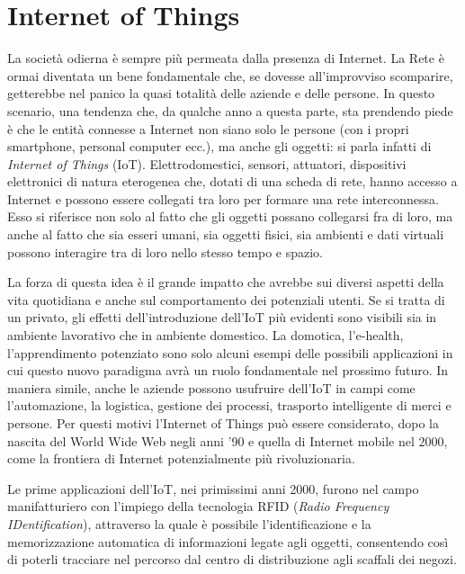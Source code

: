 \section{Internet of Things}
\label{c:tec:iot}

La società odierna è sempre più permeata dalla presenza di Internet. La Rete è ormai diventata un bene fondamentale che, se dovesse all'improvviso scomparire, getterebbe nel panico la quasi totalità delle aziende e delle persone. In questo scenario, una tendenza che, da qualche anno a questa parte, sta prendendo piede è che le entità connesse a Internet non siano solo le persone (con i propri smartphone, personal computer ecc.), ma anche gli oggetti: si parla infatti di \textit{Internet of Things} (IoT). Elettrodomestici, sensori, attuatori, dispositivi elettronici di natura eterogenea che, dotati di una scheda di rete, hanno accesso a Internet e possono essere collegati tra loro per formare una rete interconnessa. Esso si riferisce non solo al fatto che gli oggetti possano collegarsi fra di loro, ma anche al fatto che sia esseri umani, sia oggetti fisici, sia ambienti e dati virtuali possono interagire tra di loro nello stesso tempo e spazio.

La forza di questa idea è il grande impatto che avrebbe sui diversi aspetti della vita quotidiana e anche sul comportamento dei potenziali utenti. Se si tratta di un privato, gli effetti dell'introduzione dell'IoT più evidenti sono visibili sia in ambiente lavorativo che in ambiente domestico. La domotica, l'e-health, l'apprendimento potenziato sono solo alcuni esempi delle possibili applicazioni in cui questo nuovo paradigma avrà un ruolo fondamentale nel prossimo futuro. In maniera simile, anche le aziende possono usufruire dell'IoT in campi come l'automazione, la logistica, gestione dei processi, trasporto intelligente di merci e persone. 
Per questi motivi l'Internet of Things può essere considerato, dopo la nascita del World Wide Web negli anni '90 e quella di Internet mobile nel 2000, come la frontiera di Internet potenzialmente più rivoluzionaria.

Le prime applicazioni dell'IoT, nei primissimi anni 2000, furono nel campo manifatturiero con l'impiego della tecnologia RFID (\textit{Radio Frequency IDentification}), attraverso la quale è possibile l'identificazione e la memorizzazione automatica di informazioni legate agli oggetti, consentendo cos\`i di poterli tracciare nel percorso dal centro di distribuzione agli scaffali dei negozi.

